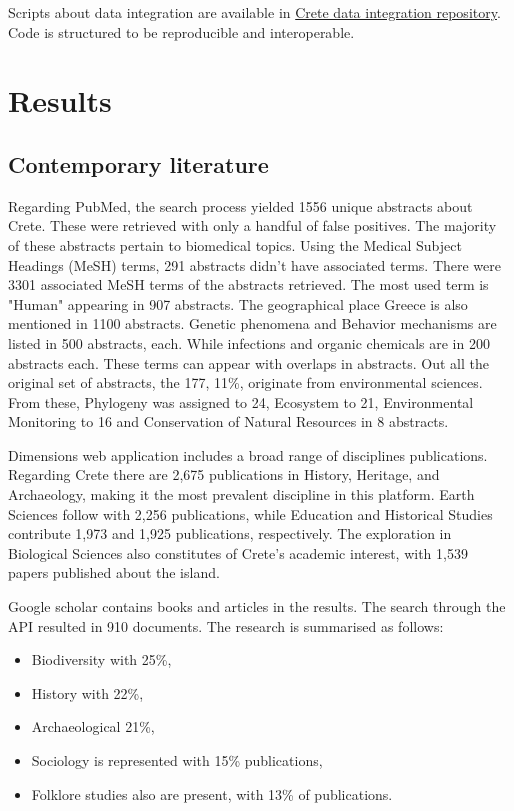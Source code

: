 Scripts about data integration are available in
\href{https://github.com/savvas-paragkamian/crete-data-integration}{Crete data integration repository}.
Code is structured to be reproducible and interoperable.

\section{Results}\label{crete_idea_results}

\subsection{Contemporary literature}

Regarding PubMed, the search process yielded 1556 unique abstracts about Crete.
These were retrieved with only a handful of false positives.
The majority of these abstracts pertain to biomedical topics.
Using the Medical Subject Headings (MeSH) terms, 291 abstracts didn't have associated terms. 
There were 3301 associated MeSH terms of the abstracts retrieved. 
The most used term is "Human" appearing in 907 abstracts. The geographical 
place Greece is also mentioned in 1100 abstracts. Genetic phenomena
and Behavior mechanisms are listed in 500 abstracts, each. 
While infections and organic chemicals are in 200 abstracts each. These terms 
can appear with overlaps in abstracts.
Out all the original set of abstracts, the 177, 11\%, originate from environmental sciences.
From these, Phylogeny was assigned to 24, Ecosystem to 21, Environmental Monitoring to 16
and Conservation of Natural Resources in 8 abstracts.

Dimensions web application includes a broad range of disciplines publications.
Regarding Crete there are 2,675 publications in History, Heritage, and Archaeology,
making it the most prevalent discipline in this platform.
Earth Sciences follow with 2,256 publications, while Education and Historical
Studies contribute 1,973 and 1,925 publications, respectively.
The exploration in Biological Sciences also constitutes of
Crete's academic interest, with 1,539 papers published about the island.

Google scholar contains books and articles in the results. The search through
the API resulted in 910 documents. 
The research is summarised as follows:

\begin{itemize}
    \item Biodiversity with 25\%,
    \item History with 22\%,
    \item Archaeological 21\%,
    \item Sociology is represented with 15\% publications,
    \item Folklore studies also are present, with 13\% of publications.
\end{itemize}

